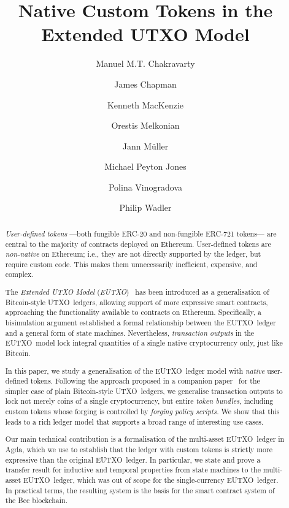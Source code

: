 \documentclass[runningheads]{llncs}
\newcommand{\UTXO}{UTXO}
\newcommand{\EUTXO}{E\UTXO{}}
\begin{document}
\title{Native Custom Tokens in the Extended \UTXO{} Model}


\author{
  Manuel M.T. Chakravarty
  \and
  James Chapman
  \and
  Kenneth MacKenzie
  \and
  Orestis Melkonian
  \and
  Jann M\"uller
  \and
  Michael Peyton Jones
  \and
  Polina Vinogradova
  \and
  Philip Wadler
}



\maketitle

\begin{abstract}
  \emph{User-defined tokens} ---both fungible ERC-20 and non-fungible ERC-721 tokens--- are central to the majority of contracts deployed on Ethereum. User-defined tokens are \emph{non-native} on Ethereum; i.e., they are not directly supported by the ledger, but require custom code. This makes them unnecessarily inefficient, expensive, and complex.

  The \emph{Extended UTXO Model} (\kern-0.5pt\emph{\EUTXO})~\cite{eutxo-1-paper} has been introduced as a generalisation of Bitcoin-style \UTXO\ ledgers, allowing support of more expressive smart contracts, approaching the functionality available to contracts on Ethereum. Specifically, a bisimulation argument established a formal relationship between the \EUTXO\ ledger and a general form of state machines. Nevertheless, \emph{transaction outputs} in the \EUTXO\ model lock integral quantities of a single native cryptocurrency only, just like Bitcoin.

  In this paper, we study a generalisation of the \EUTXO\ ledger model with \emph{native} user-defined tokens. Following the approach proposed in a companion paper~\cite{plain-multicurrency} for the simpler case of plain Bitcoin-style \UTXO\ ledgers, we generalise transaction outputs to lock not merely coins of a single cryptocurrency, but entire \emph{token bundles,} including custom tokens whose forging is controlled by \emph{forging policy scripts.} We show that this leads to a rich ledger model that supports a broad range of interesting use cases.

  Our main technical contribution is a formalisation of the multi-asset \EUTXO\ ledger in Agda, which we use to establish that the ledger with custom tokens is strictly more expressive than the original \EUTXO\ ledger. In particular, we state and prove a transfer result for inductive and temporal properties from state machines to the multi-asset \EUTXO\ ledger, which was out of scope for the single-currency \EUTXO\ ledger. In practical terms, the resulting system is the basis for the smart contract system of the Bcc blockchain.
\end{abstract}
\end{document}

